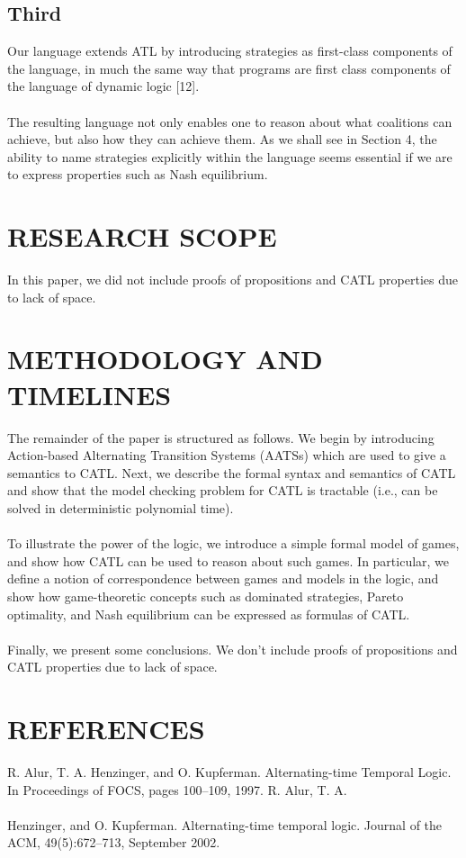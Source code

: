 \documentclass[10pt,a4paper]{article}
\begin{document}
\subsection{Third}
Our language extends ATL by introducing strategies as first-class components of the language, in much the same way that programs are first class components of the language of dynamic logic [12].\\\\ The resulting language not only enables one to reason about what coalitions can achieve, but also how they can achieve them. As we shall see in Section 4, the ability to name strategies explicitly within the language seems essential if we are to express properties such as Nash equilibrium.

\section{RESEARCH SCOPE}
In this paper, we did not include proofs of propositions and CATL properties due to lack of space.


\section{METHODOLOGY AND TIMELINES}
The remainder of the paper is structured as follows. 
We begin by introducing Action-based Alternating Transition Systems (AATSs)  which are used to give a semantics to CATL. Next, we describe the formal syntax and semantics of CATL and show that the model checking problem for CATL is tractable (i.e., can be solved in deterministic polynomial time). \\\\To illustrate the power of the logic, we introduce a simple formal model of games, and show how CATL can be used to reason about such games. In particular, we define a notion of correspondence between games and models in the logic, and show how game-theoretic concepts such as dominated strategies, Pareto optimality, and Nash equilibrium can be expressed as formulas of CATL.\\\\ Finally, we present some conclusions. We don’t include proofs of propositions and CATL properties due to lack of space.

\section{REFERENCES}


R. Alur, T. A. Henzinger, and O. Kupferman. Alternating-time Temporal Logic. In Proceedings of FOCS, pages 100–109, 1997.  R. Alur, T. A.\\\\Henzinger, and O. Kupferman.
Alternating-time temporal logic. Journal of the ACM, 49(5):672–713, September 2002.
 
	
\end{document}
